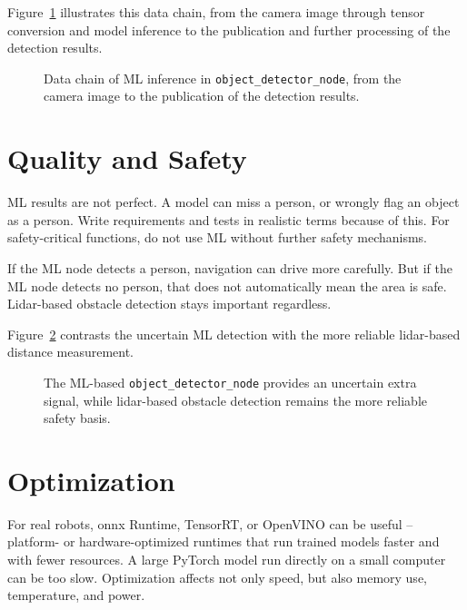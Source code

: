 Figure~\ref{fig:kap18-datenkette-ml-inferenz} illustrates this data chain, from the camera image through tensor conversion and model inference to the publication and further processing of the detection results.

\begin{figure}[H]
  \centering
  \resizebox{\textwidth}{!}{}
  \caption{Data chain of ML inference in \texttt{object\_detector\_node}, from the camera image to the publication of the detection results.}
  \label{fig:kap18-datenkette-ml-inferenz}
\end{figure}

\section{Quality and Safety}
ML results are not perfect. A model can miss a person, or wrongly flag an object as a person. Write requirements and tests in realistic terms because of this. For safety-critical functions, do not use ML without further safety mechanisms.

\begin{praxisbox}
If the ML node detects a person, navigation can drive more carefully. But if the ML node detects no person, that does not automatically mean the area is safe. Lidar-based obstacle detection stays important regardless.
\end{praxisbox}

Figure~\ref{fig:kap18-ml-sicherheitsarchitektur} contrasts the uncertain ML detection with the more reliable lidar-based distance measurement.

\begin{figure}[H]
  \centering
  \caption{The ML-based \texttt{object\_detector\_node} provides an uncertain extra signal, while lidar-based obstacle detection remains the more reliable safety basis.}
  \label{fig:kap18-ml-sicherheitsarchitektur}
\end{figure}

\section{Optimization}
For real robots, \gls{onnx} Runtime, TensorRT, or OpenVINO can be useful -- platform- or hardware-optimized runtimes that run trained models faster and with fewer resources. A large PyTorch model run directly on a small computer can be too slow. Optimization affects not only speed, but also memory use, temperature, and power.


